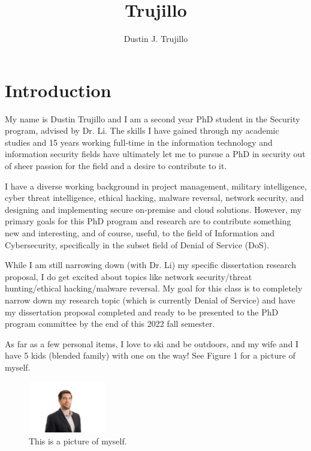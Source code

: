 \documentclass[a4paper]{article}
\date{\displaydate{date}}
\title{Trujillo}
\author{Dustin J. Trujillo}
\begin{document}
\maketitle


\section{Introduction}

My name is Dustin Trujillo and I am a second year PhD student in the Security program, advised by Dr. Li. The skills I have gained through my academic studies and 15 years working full-time in the information technology and information security fields have ultimately let me to pursue a PhD in security out of sheer passion for the field and a desire to contribute to it.

I have a diverse working background in project management, military intelligence, cyber threat intelligence, ethical hacking, malware reversal, network security, and designing and implementing secure on-premise and cloud solutions. However, my primary goals for this PhD program and research are to contribute something new and interesting, and of course, useful, to the field of Information and Cybersecurity, specifically in the subset field of Denial of Service (DoS).

While I am still narrowing down (with Dr. Li) my specific dissertation research proposal, I do get excited about topics like network security/threat hunting/ethical hacking/malware reversal. My goal for this class is to completely narrow down my research topic (which is currently Denial of Service) and have my dissertation proposal completed and ready to be presented to the PhD program committee by the end of this 2022 fall semester.

As far as a few personal items, I love to ski and be outdoors, and my wife and I have 5 kids (blended family) with one on the way! See Figure 1 for a picture of myself.

\begin{figure}[H]
\centering
\includegraphics[width=0.3\textwidth]{trujillo.jpg}
\caption{\label{fig:Me}This is a picture of myself.}
\end{figure}
\end{document}

